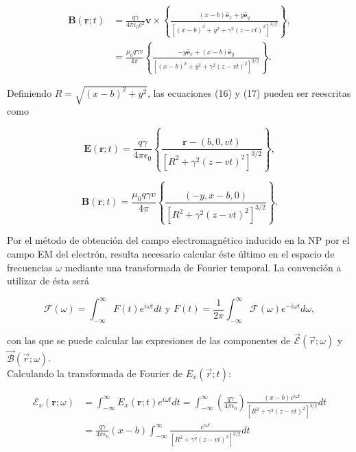 \documentclass[a4paper,10pt]{article}
\begin{document}
\begin{equation}
\begin{aligned}
\textbf{B}(\textbf{r};t)
	&=\frac{q\gamma}{4\pi \epsilon_0 c^2} \textbf{v}\times\left\{\frac{(x-b)\hat{\textbf{e}}_x+y\hat{\textbf{e}}_y}{[(x-b)^2+y^2+\gamma^2(z-vt)^2]^{3/2}}\right\},	\\
	&=\frac{\mu_0 q\gamma v}{4\pi}\left\{ \frac{-y\hat{\textbf{e}}_x+(x-b)\hat{\textbf{e}}_y}{[(x-b)^2+y^2+\gamma^2(z-vt)^2]^{3/2}}\right\}.
\end{aligned}
\end{equation}

Definiendo $R=\sqrt{(x-b)^2+y^2}$, las ecuaciones (16) y (17) pueden ser reescritas como

\begin{equation}
\textbf{E}(\textbf{r};t)	=\frac{q\gamma}{4\pi \epsilon_0}\left\{\frac{\textbf{r}-(b,0,vt)}{[R^2+\gamma^2(z-vt)^2]^{3/2}}\right\},
\end{equation}

\begin{equation}
\textbf{B}(\textbf{r};t)	=\frac{\mu_0 q\gamma v}{4\pi}\left\{ \frac{(-y,x-b,0)}{[R^{2}+\gamma^2(z-vt)^2]^{3/2}}\right\}.
\end{equation}

Por el método de obtención del campo electromagnético inducido en la NP por el campo EM del electrón, resulta necesario calcular éste último en el espacio de frecuencias $\omega$ mediante una transformada de Fourier temporal. La convención a utilizar de ésta será

\begin{equation}
\mathcal{F} (\omega)=\int_{-\infty}^{\infty} F(t)e^ {i\omega t} dt \text{		y		} F(t)=\frac{1}{2\pi}\int_{-\infty}^{\infty} \mathcal{F}(\omega)e^ {-i\omega t} d\omega,
\end{equation}

con las que se puede calcular las expresiones de las componentes de $\vec{\mathcal{E}}(\vec{r};\omega)$ y $\vec{\mathcal{B}}(\vec{r};\omega)$.
\\
Calculando la transformada de Fourier de $E_x(\vec{r};t)$:

\begin{equation}
\begin{aligned}
\mathcal{E}_x(\textbf{r};\omega)		&= \int_{-\infty}^{\infty} E_x(\textbf{r};t)e^{i\omega t} dt
					=\int_{-\infty}^{\infty} \left( \frac{q\gamma}{4\pi \epsilon_0} \right) \frac{(x-b)e^{i\omega t}}{[R^2+\gamma^2(z-vt)^2]^{3/2}} dt	\\
					&=\frac{q\gamma}{4\pi \epsilon_0} (x-b)\int_{-\infty}^{\infty} \frac{e^{i\omega t}}{[R^2+\gamma^2(z-vt)^2]^{3/2}} dt
\end{aligned}
\end{equation}
\end{document}
